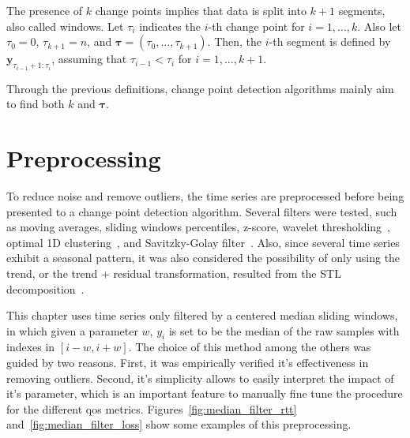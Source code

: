 The presence of $k$ change points implies that data is split into $k+1$
segments, also called windows. Let $\tau_{i}$ indicates the $i$-th change point
for $i=1, \ldots, k$. Also let $\tau_{0} = 0$, $\tau_{k + 1} = n$, and
$\boldsymbol \tau = (\tau_{0}, \ldots, \tau_{k + 1})$. Then, the $i$-th segment
is defined by $\mathbf{y}_{\tau_{i - 1} + 1 : \tau_{i}}$, assuming that
$\tau_{i - 1} < \tau_{i}$ for $i = 1, \ldots, k + 1$.

Through the previous definitions, change point detection algorithms mainly aim
to find both $k$ and $\boldsymbol \tau$.

\section{Preprocessing}

To reduce noise and remove outliers, the time series are
preprocessed before being presented to a change point detection algorithm.
Several filters were tested, such as moving averages, sliding windows
percentiles, z-score,
wavelet thresholding~\cite{an_introduction_to_wavelets}, optimal 1D
clustering~\cite{ckmeans_1d_dp_optimal_k_means_clustering_in_one_dimension_by_dynamic_programming},
and Savitzky-Golay filter~\cite{savgol}.
Also, since several time series exhibit a seasonal pattern,
it was also considered the possibility of only using the
trend, or the trend + residual transformation,
resulted from the STL
decomposition~\cite{stl_a_seasonal_trend_decomposition_procedure_based_on_loess}.

This chapter uses time series only filtered by a centered median
sliding windows, in which given a parameter $w$, $y_{i}$ is set to be
the median of the raw samples with indexes in $[i-w, i+w]$.
The choice of this method among the others was guided by two reasons.
First, it was empirically verified it's effectiveness in removing outliers.
Second, it's simplicity allows to easily interpret the impact of it's parameter,
which is an important feature to manually fine tune the procedure for the
different \gls*{qos} metrics.
Figures~\ref{fig:median_filter_rtt} and~\ref{fig:median_filter_loss} show
some examples of this preprocessing.

